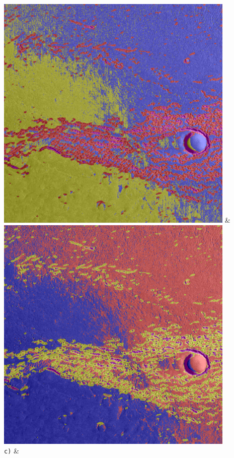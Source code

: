 \begin{table}[h!]
\begin{tabularx}{\textwidth}
		\includegraphics[width=0.9\linewidth]{images/gen/color_weight/p03_02.png_1.33.png} &
		\includegraphics[width=0.9\linewidth]{images/gen/color_weight/p03_02.png_1.66.png} \\
		\texttt{c)} &

\end{tabularx}
\end{table}
